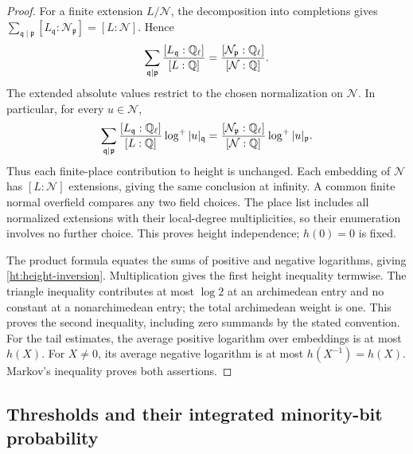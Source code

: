 \begin{proof}
For a finite extension \(L/\mathcal N\), the decomposition into
completions \cite[Proposition~8.2]{ProductFormula} gives
\(\sum_{\mathfrak q\mid\mathfrak p}[L_{\mathfrak q}:\mathcal N_{\mathfrak p}]
=[L:\mathcal N]\). Hence
\[
 \sum_{\mathfrak q\mid\mathfrak p}
 \frac{[L_{\mathfrak q}:\mathbb Q_\ell]}{[L:\mathbb Q]}
 =\frac{[\mathcal N_{\mathfrak p}:\mathbb Q_\ell]}{[\mathcal N:\mathbb Q]}.
\]
The extended absolute values restrict to the chosen normalization on
\(\mathcal N\). In particular, for every \(u\in\mathcal N\),
\[
 \sum_{\mathfrak q\mid\mathfrak p}
 \frac{[L_{\mathfrak q}:\mathbb Q_\ell]}{[L:\mathbb Q]}\log^+|u|_{\mathfrak q}
 =\frac{[\mathcal N_{\mathfrak p}:\mathbb Q_\ell]}{[\mathcal N:\mathbb Q]}
       \log^+|u|_{\mathfrak p}.
\]
Thus each finite-place contribution to height is unchanged.
Each embedding of \(\mathcal N\)
has \([L:\mathcal N]\) extensions, giving the same conclusion at
infinity. A common finite normal overfield compares any two field
choices. The place list includes all normalized extensions with their
local-degree multiplicities, so their enumeration involves no further
choice. This proves height independence; \(h(0)=0\) is fixed.

The product formula equates the sums of positive and negative logarithms,
giving \eqref{ht:height-inversion}. Multiplication gives the first height
inequality termwise. The triangle inequality contributes at most $\log2$
at an archimedean entry and no constant at a nonarchimedean entry; the
total archimedean weight is one. This proves the second inequality,
including zero summands by the stated convention. For the tail estimates,
the average positive logarithm over embeddings is at most $h(X)$.
For $X\ne0$, its average negative logarithm is at most $h(X^{-1})=h(X)$.
Markov's inequality proves both assertions.
\end{proof}

\subsection{Thresholds and their integrated minority-bit probability}\label{sec:levels}

